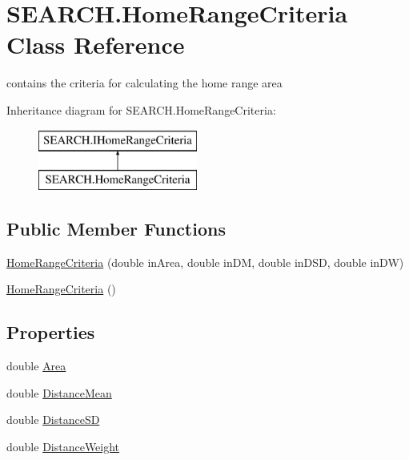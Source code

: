 \hypertarget{class_s_e_a_r_c_h_1_1_home_range_criteria}{\section{S\-E\-A\-R\-C\-H.\-Home\-Range\-Criteria Class Reference}
\label{class_s_e_a_r_c_h_1_1_home_range_criteria}
}


contains the criteria for calculating the home range area  


Inheritance diagram for S\-E\-A\-R\-C\-H.\-Home\-Range\-Criteria\-:\begin{figure}[H]
\begin{center}
\leavevmode
\includegraphics[height=2.000000cm]{class_s_e_a_r_c_h_1_1_home_range_criteria}
\end{center}
\end{figure}
\subsection*{Public Member Functions}
\begin{DoxyCompactItemize}
\item 
\hyperlink{class_s_e_a_r_c_h_1_1_home_range_criteria_a00f764a755326537e5c454f5e4f50b95}{Home\-Range\-Criteria} (double in\-Area, double in\-D\-M, double in\-D\-S\-D, double in\-D\-W)
\item 
\hyperlink{class_s_e_a_r_c_h_1_1_home_range_criteria_abc163593f3e7f29b83505a6fe2517c92}{Home\-Range\-Criteria} ()
\end{DoxyCompactItemize}
\subsection*{Properties}
\begin{DoxyCompactItemize}
\item 
double \hyperlink{class_s_e_a_r_c_h_1_1_home_range_criteria_a3d4caf6cd00810b53162b324d45edf02}{Area}
\item 
double \hyperlink{class_s_e_a_r_c_h_1_1_home_range_criteria_afecf658def789f1220a0967c6ef26160}{Distance\-Mean}
\item 
double \hyperlink{class_s_e_a_r_c_h_1_1_home_range_criteria_a3cae651fa48e552e6eec6f9fa8fcdb5e}{Distance\-S\-D}
\item 
double \hyperlink{class_s_e_a_r_c_h_1_1_home_range_criteria_aa5642715adf3682f7dd16a1914dd92c3}{Distance\-Weight}
\end{DoxyCompactItemize}


